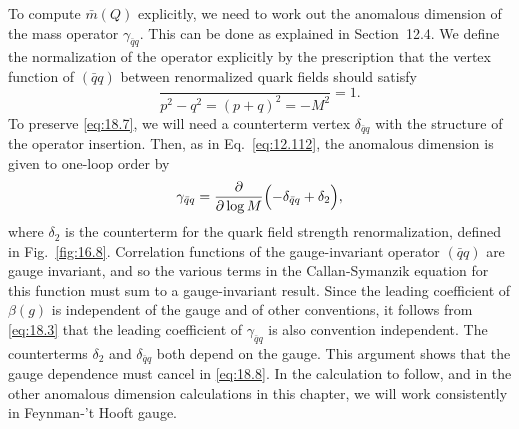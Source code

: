 To compute $\bar{m}(Q)$ explicitly, we need to work out the anomalous
dimension of the mass operator $\gamma_{\bar{q}q}$.  This can be done as
explained in Section~12.4.  We define the normalization of the operator
explicitly by the prescription that the vertex function of $(\bar{q}q)$
between renormalized quark fields should satisfy
\begin{equation}
  \frac{}{p^2-q^2=(p+q)^2=-M^2} = 1 .
  \label{eq:18.7}
\end{equation}
To preserve \eqref{eq:18.7}, we will need a counterterm vertex $\delta_{\bar{q}q}$
with the structure of the operator insertion.  Then, as in Eq.~\eqref{eq:12.112},
the anomalous dimension is given to one-loop order by
\begin{equation}
  \gamma_{\bar{q}q} = \frac{\partial}{\partial\log M}\Bigl(
    -\delta_{\bar{q}q} + \delta_2 \Bigr) ,
  \label{eq:18.8}
\end{equation}
where $\delta_2$ is the counterterm for the quark field strength
renormalization, defined in Fig.~\ref{fig:16.8}.  Correlation functions of the
gauge-invariant operator $(\bar{q}q)$ are gauge invariant, and so the various
terms in the Callan-Symanzik equation for this function must sum to a
gauge-invariant result.  Since the leading coefficient of $\beta(g)$ is
independent of the gauge and of other conventions, it follows from
\eqref{eq:18.3} that the leading coefficient of $\gamma_{\bar{q}q}$ is also
convention independent.  The counterterms $\delta_2$ and $\delta_{\bar{q}q}$
both depend on the gauge.  This argument shows that the gauge dependence
must cancel in \eqref{eq:18.8}.  In the calculation to follow, and in the
other anomalous dimension calculations in this chapter, we will work
consistently in Feynman-'t Hooft gauge.

